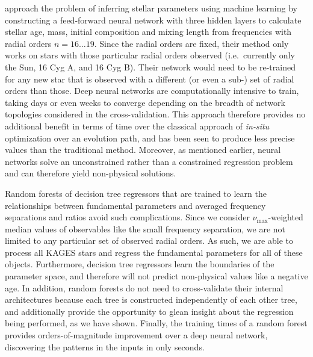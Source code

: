 \documentclass[manuscript]{aastex}
\begin{document}
\citet{2016arXiv160200902V} approach the problem of inferring stellar parameters using machine learning by constructing a feed-forward neural network with three hidden layers to calculate stellar age, mass, initial composition and mixing length from frequencies with radial orders $n=16\ldots 19$. Since the radial orders are fixed, their method only works on stars with those particular radial orders observed (i.e.~currently only the Sun, 16 Cyg A, and 16 Cyg B). Their network would need to be re-trained for any new star that is observed with a different (or even a sub-) set of radial orders than those. Deep neural networks are computationally intensive to train, taking days or even weeks to converge depending on the breadth of network topologies considered in the cross-validation. This approach therefore provides no additional benefit in terms of time over the classical approach of \emph{in-situ} optimization over an evolution path, and has been seen to produce less precise values than the traditional method.%
Moreover, as mentioned earlier, neural networks solve an unconstrained rather than a constrained regression problem and can therefore yield non-physical solutions. 

Random forests of decision tree regressors that are trained to learn the relationships between fundamental parameters and averaged frequency separations and ratios avoid such complications. Since we consider $\nu_{\max}$-weighted median values of observables like the small frequency separation, we are not limited to any particular set of observed radial orders. As such, we are able to process all KAGES stars and regress the fundamental parameters for all of these objects. Furthermore, decision tree regressors learn the boundaries of the parameter space, and therefore will not predict non-physical values like a negative age. In addition, random forests do not need to cross-validate their internal architectures because each tree is constructed independently of each other tree, and additionally provide the opportunity to glean insight about the regression being performed, as we have shown. Finally, the training times of a random forest provides orders-of-magnitude improvement over a deep neural network, discovering the patterns in the inputs in only seconds. %
\end{document}

